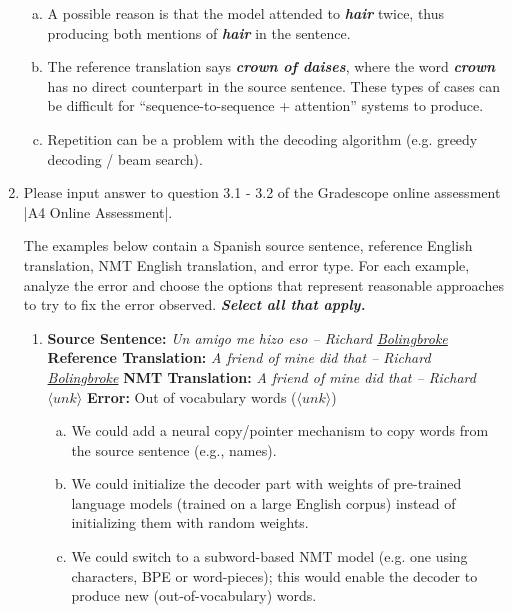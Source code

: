 \begin{enumerate}[1.]
\begin{enumerate}[(a)]
\item A possible reason is that the model attended to {\bf {\em hair}} twice, thus producing both mentions of {\bf {\em hair}} in the sentence.
\item The reference translation says {\bf {\em crown of daises}}, where the word {\bf {\em crown}} has no direct counterpart in the source sentence. These types of cases can be difficult for ``sequence-to-sequence + attention'' systems to produce.
\item Repetition can be a problem with the decoding algorithm (e.g. greedy decoding / beam search).
\end{enumerate}


\item
Please input answer to question 3.1 - 3.2 of the Gradescope online assessment |A4 Online Assessment|.

The examples below contain a Spanish source sentence, reference English translation, NMT English translation, and error type. For each example, analyze the error and choose the options that represent reasonable approaches to try to fix the error observed. {\bf {\em Select all that apply.}}

\begin{enumerate}[3a.]
\item {} 

{\bf Source Sentence:} {\em Un amigo me hizo eso -- Richard \underline{Bolingbroke}}
\newline
{\bf Reference Translation:} {\em A friend of mine did that -- Richard \underline{Bolingbroke}}
\newline
{\bf NMT Translation:} {\em A friend of mine did that -- Richard $\langle unk \rangle$}
\newline 
{\bf Error:} Out of vocabulary words ($\langle unk \rangle$)
\newline

\begin{enumerate}[(a)]
\item We could add a neural copy/pointer mechanism to copy words from the source sentence (e.g., names).
\item We could initialize the decoder part with weights of pre-trained language models (trained on a large English corpus) instead of initializing them with random weights.
\item We could switch to a subword-based NMT model (e.g. one using characters, BPE or word-pieces); this would enable the decoder to produce new (out-of-vocabulary) words.
\end{enumerate}


\end{enumerate}
\end{enumerate}
